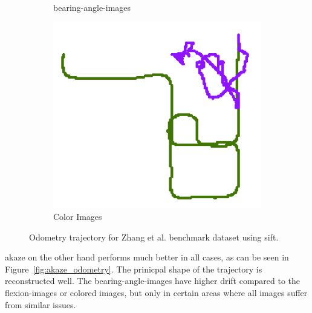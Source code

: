 \begin{figure}[htp]
\begin{subfigure}[c]{0.31\linewidth}
    \caption{\glspl{bearing-angle-image}}
\end{subfigure}%
\begin{subfigure}[c]{0.31\linewidth}
    \includegraphics[width=\linewidth]{chapter06/odo/zhang_pinhole_SIFT_nice.png}%
    \caption{Color Images}
\end{subfigure}
\caption{Odometry trajectory for Zhang et al.\cite{zhang_icra2016} benchmark dataset using \acrshort{sift}.}\label{fig:sift_odometry}
\end{figure}
\acrshort{akaze} on the other hand performs much better in all cases, as can be seen in Figure~\ref{fig:akaze_odometry}.
The prinicpal shape of the trajectory is reconstructed well.
The \glspl{bearing-angle-image} have higher drift compared to the \glspl{flexion-image} or colored images, but only in certain areas where all images suffer from similar issues.
